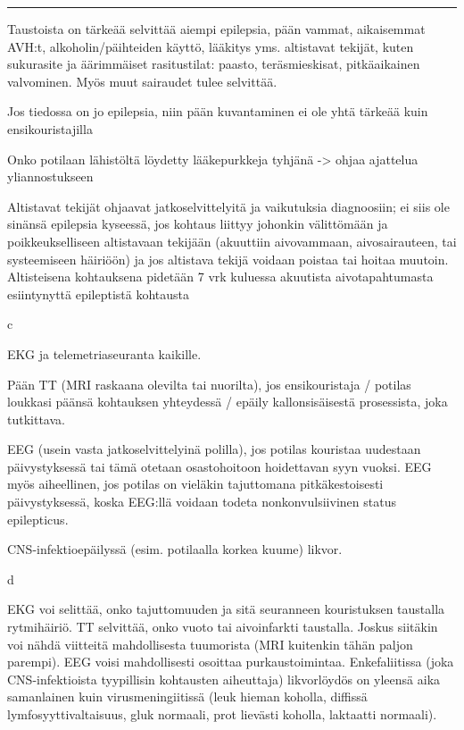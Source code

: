 \documentclass[
]{book}
\begin{document}
\begin{center}\rule{0.5\linewidth}{0.5pt}\end{center}

Taustoista on tärkeää selvittää aiempi epilepsia, pään vammat, aikaisemmat AVH:t, alkoholin/päihteiden käyttö, lääkitys yms. altistavat tekijät, kuten sukurasite ja äärimmäiset rasitustilat: paasto, teräsmieskisat, pitkäaikainen valvominen. Myös muut sairaudet tulee selvittää.

Jos tiedossa on jo epilepsia, niin pään kuvantaminen ei ole yhtä tärkeää kuin ensikouristajilla

Onko potilaan lähistöltä löydetty lääkepurkkeja tyhjänä -\textgreater{} ohjaa ajattelua yliannostukseen

Altistavat tekijät ohjaavat jatkoselvittelyitä ja vaikutuksia diagnoosiin; ei siis ole sinänsä epilepsia kyseessä, jos kohtaus liittyy johonkin välittömään ja poikkeukselliseen altistavaan tekijään (akuuttiin aivovammaan, aivosairauteen, tai systeemiseen häiriöön) ja jos altistava tekijä voidaan poistaa tai hoitaa muutoin. Altisteisena kohtauksena pidetään 7 vrk kuluessa akuutista aivotapahtumasta esiintynyttä epileptistä kohtausta

c

EKG ja telemetriaseuranta kaikille.

Pään TT (MRI raskaana olevilta tai nuorilta), jos ensikouristaja / potilas loukkasi päänsä kohtauksen yhteydessä / epäily kallonsisäisestä prosessista, joka tutkittava.

EEG (usein vasta jatkoselvittelyinä polilla), jos potilas kouristaa uudestaan päivystyksessä tai tämä otetaan osastohoitoon hoidettavan syyn vuoksi. EEG myös aiheellinen, jos potilas on vieläkin tajuttomana pitkäkestoisesti päivystyksessä, koska EEG:llä voidaan todeta nonkonvulsiivinen status epilepticus.

CNS-infektioepäilyssä (esim. potilaalla korkea kuume) likvor.

d

EKG voi selittää, onko tajuttomuuden ja sitä seuranneen kouristuksen taustalla rytmihäiriö. TT selvittää, onko vuoto tai aivoinfarkti taustalla. Joskus siitäkin voi nähdä viitteitä mahdollisesta tuumorista (MRI kuitenkin tähän paljon parempi). EEG voisi mahdollisesti osoittaa purkaustoimintaa. Enkefaliitissa (joka CNS-infektioista tyypillisin kohtausten aiheuttaja) likvorlöydös on yleensä aika samanlainen kuin virusmeningiitissä (leuk hieman koholla, diffissä lymfosyyttivaltaisuus, gluk normaali, prot lievästi koholla, laktaatti normaali).
\end{document}
